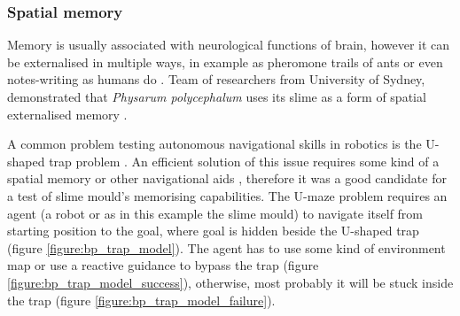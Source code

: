 \documentclass[english,a4paper,twoside]{ppfcmthesis}
\begin{document}
\subsubsection{Spatial memory}

Memory is usually associated with neurological functions of brain, however it can be externalised in multiple ways, in example as pheromone trails of ants \cite{carroll1973ecology} or even notes-writing as humans do \cite{fisher1973effect}. Team of researchers from University of Sydney, demonstrated that \textit{Physarum polycephalum} uses its slime as a form of spatial externalised memory \cite{reid2012slime}.

A common problem testing autonomous navigational skills in robotics is the U-shaped trap problem \cite{chatterjee2001use}. An efficient solution of this issue requires some kind of a spatial memory or other navigational aids \cite{balch1993avoiding}, therefore it was a good candidate for a test of slime mould's memorising capabilities. The U-maze problem requires an agent (a robot or as in this example the slime mould) to navigate itself from starting position to the goal, where goal is hidden beside the U-shaped trap (figure \ref{figure:bp_trap_model}). The agent has to use some kind of environment map or use a reactive guidance to bypass the trap (figure \ref{figure:bp_trap_model_success}), otherwise, most probably it will be stuck inside the trap (figure \ref{figure:bp_trap_model_failure}).
\end{document}
